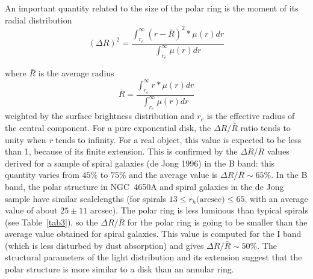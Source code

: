 \documentclass[preprint]{aastex}
\begin{document}
An important quantity related to the size of the polar ring 
is the moment of its radial distribution 
\begin{equation}
(\Delta R)^2 = \frac{\int_{r_{e}}^{\infty}(r-\bar{R})^{2}*\mu(r) dr}{\int_{r_{e}}^{\infty} \mu(r) dr}
\end{equation}

where $\bar{R}$ is 
the average radius 
\begin{equation}
\bar{R} = \frac{\int_{r_{e}}^{\infty} r*\mu(r) dr}{\int_{r_{e}}^{\infty} \mu(r) dr}
\end{equation}
weighted by the surface brightness distribution and $r_{e}$
is the effective radius of the central component. 
For a pure exponential disk, the  $\Delta R / \bar{R}$ ratio tends to 
unity when {\it r} tends to infinity.
For a real object, this value is expected to be less than 1, because of its 
finite extension.
This is confirmed by the  $\Delta R / \bar{R}$ values derived for a sample of 
spiral galaxies (de Jong 1996) in the B band: this quantity varies 
from $45\%$ to $75\%$ and the average value is $\Delta R /\bar{R} \sim 65\%$. 
In the B band, the polar structure in NGC~4650A and spiral galaxies 
in the de Jong sample have similar scalelengths  
(for spirals $13 \le r_h \mbox{(arcsec)} \le 65$, 
with an average value of about $25 \pm 11$ arcsec). 
The polar ring is less luminous than typical spirals (see
Table~\ref{tab3}),
so the $\Delta R / \bar{R}$ for the polar ring
is going to be smaller than the average value obtained for spiral galaxies.
This value is computed for the I band (which is less disturbed by dust 
absorption) and gives $\Delta R / \bar{R}\sim 50\%$.
The structural parameters of the light distribution and its extension
suggest that the polar structure is more similar to a disk than
an annular ring.
\end{document}
